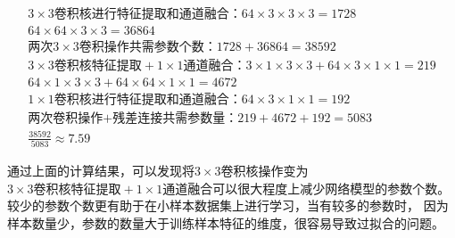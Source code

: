 \documentclass[AutoFakeBold]{LZUThesis}
\begin{document}
\begin{equation}
    \begin{split}
        3\times3\mbox{卷积核进行特征提取和通道融合：}64 \times 3 \times 3 \times 3=1728\\
        64\times 64 \times3\times 3=36864\\
        \mbox{两次}3\times 3\mbox{卷积操作共需参数个数：}1728+36864=38592\\
        3\times 3\mbox{卷积核特征提取}+ 1\times 1\mbox{通道融合：}3 \times 1 \times 3 \times 3+ 64 \times 3 \times 1 \times 1=219 \\
        64\times 1\times 3\times 3+64\times 64\times 1\times1=4672\\
        1\times1\mbox{卷积核进行特征提取和通道融合：}64\times 3\times1 \times 1  =192 \\
        \mbox{两次卷积操作+残差连接共需参数量：}219+4672+192=5083\\
        \frac{38592}{5083}\approx 7.59
        \nonumber
    \end{split}
\end{equation}
\par
通过上面的计算结果，可以发现将$3\times 3$卷积核操作变为$3\times 3卷积核特征提取+ 1\times 1通道融合$可以很大程度上减少网络模型的参数个数。较少的参数个数更有助于在小样本数据集上进行学习，当有较多的参数时，
因为样本数量少，参数的数量大于训练样本特征的维度，很容易导致过拟合的问题。




\end{document}

